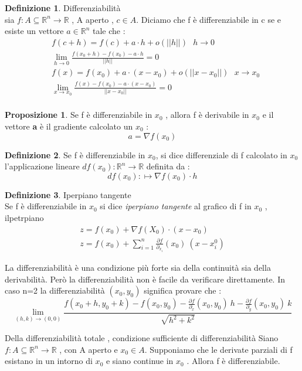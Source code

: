 \documentclass{article}
\theoremstyle{definition}
\newtheorem*{definizione}{Definizione}
\newtheorem*{proposizione}{Proposizione}
\newcommand{\R}{\mathbb{R}}
\newcommand{\Rn}{\R^n}
\newcommand{\fn}{f: A\subseteq \Rn \rightarrow \R}
\begin{document}
	\begin{definizione}
		Differenziabilità \\
		sia $\fn$ , A aperto , $c \in A$. Diciamo che f è differenziabile in c se e esiste un vettore $a \in \Rn $ tale che : 
		\begin{align*}
			&f(c+h)=f(c)+a \cdot h +o(||h||) \ \ \ h \rightarrow 0 \\
			&\lim_{h\rightarrow 0}\frac{f(x_0+h)-f(x_0)-a\cdot h}{||h||}=0\\
			&f(x)=f(x_0)+a \cdot (x-x_0) + o (||x-x_0||) \ \ \ x \rightarrow x_0\\
			&\lim_{x\rightarrow x_0}\frac{f(x)-f(x_0)-a\cdot (x-x_0)}{||x-x_0||}=0\\
		\end{align*}
	\end{definizione}
	\begin{proposizione}
		Se f è differenziabile in $x_0$ , allora f è derivabile in $x_0$ e il vettore \textbf{a} è il gradiente calcolato un $x_0$ :
		$$a=\nabla f(x_0)$$
	\end{proposizione}
	\begin{definizione}
		Se f è differenziabile in $x_0$, si dice differenziale di f calcolato in $x_0$ l'applicazione lineare $df(x_0):\Rn \rightarrow \R$ definita da : $$df(x_0):\mapsto \nabla f(x_0)\cdot h$$
	\end{definizione}
	\begin{definizione}
		Iperpiano tangente \\
		Se f è differenziabile in $x_0$ si dice \textit{iperpiano tangente} al grafico di f in $x_0$ , ilpetrpiano 
		\begin{align*}
			z=f(x_0)+\nabla f(X_0) \cdot (x-x_0)\\
			z=f(x_0)+\sum_{i=1}^n\frac{\partial f}{\partial_{x_i}}(x_0) \ (x-x_i^0)   \end{align*}
	\end{definizione}
	La differenziabilità è una condizione più forte sia della continuità sia della derivabilità.
	Però la differenziabilità non è facile da verificare direttamente. In caso n=2 la differenziabilità $(x_0,y_0)$ significa provare che : $$\lim_{(h,k)\rightarrow (0,0)}\frac{f(x_0+h,y_0+k)-f(x_0,y_0)-\frac{\partial f}{\partial_x}(x_0,y_0)\ h-\frac{\partial f}{\partial_y}(x_0,y_0)\ k}{\sqrt{h^2+k^2}}$$
	\begin{teo}{Della differenziabilità totale , condizione sufficiente di differenziabilità}{}
		Siano $\fn$ , con A aperto e $x_0 \in A$. Supponiamo che le derivate parziali di f esistano in un intorno di $x_0$ e siano continue in $x_0$ . Allora f è differenziabile. \\
	\end{teo}
\end{document}
